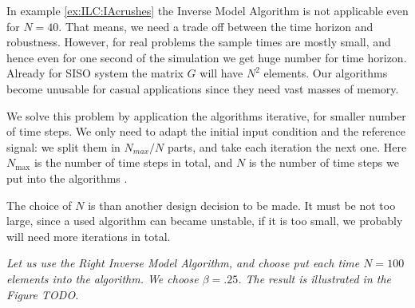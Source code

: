 	In example \ref{ex:ILC:IAcrushes} the Inverse Model Algorithm is not applicable even for $N = 40$. 
	That means, we need a trade off between the time horizon and robustness.
	However, for real problems the sample times are mostly small, and hence even for one second of the simulation we get huge number for time horizon. Already for SISO system the matrix $G$ will have $N^2$ elements. Our algorithms become unusable for casual applications since they need vast masses of memory.	
		
	We solve this problem by application the algorithms iterative, for smaller number of time steps. We only need to adapt the initial input condition and the reference signal: we split them in $N_{max}/N$ parts, and take each iteration the next one. Here $N_{\max}$ is the number of time steps in total, and $N$ is the number of time steps we put into the algorithms .
	
	The choice of $N$ is than another design  decision to be made. It must be not too large, since a used algorithm can became unstable, if it is too small, we probably will need more iterations in total. 
	

\begin{example}[contined]
\textit{Let us use the Right Inverse Model Algorithm, and choose put each time $N =100$ elements into the algorithm. 
We choose $\beta = .25$. The result is illustrated in the Figure TODO. }


\end{example}    

	
	
	